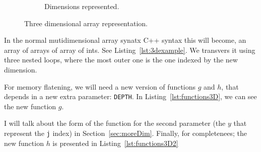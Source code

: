 \begin{figure}[htp]
\begin{subfigure}[b]{0.2\textwidth}
    \caption{Dimensions represented.}
    \label{fig:3b}
  \end{subfigure}
  \caption{Three dimensional array representation.}
  \label{fig:3D}
\end{figure}

In the normal mutidimensional array synatx C++ syntax this will become, an array of arrays of array of ints. See Listing~\ref{lst:3dexample}. We transvers it using three nested loops, where the most outer one is the one indexed by the new dimension.

{\centering
\begin{minipage}{\linewidth}
\end{minipage}
\par
}
\vspace{0.5cm}

For memory flatening, we will need a new version of functions $g$ and $h$, that depends in a new extra parameter: \texttt{DEPTH}.
In Listing~\ref{lst:functions3D}, we can see the new function $g$.

{\centering
\begin{minipage}{\linewidth}
\end{minipage}
\par
}
\vspace{0.5cm}

I will talk about the form of the function for the second parameter (the $y$ that represent the \texttt{j} index) in Section~\ref{sec:moreDim}. Finally, for completenees; the new function $h$ is presented in Listing~\ref{lst:functions3D2}


